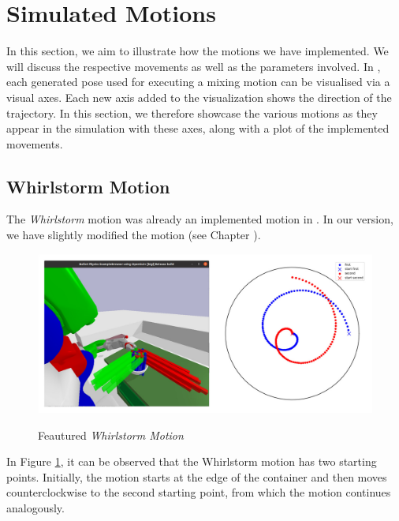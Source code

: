 \section{Simulated Motions}
\label{sec:simulated motions}
In this section, we aim to illustrate how the motions we have implemented.
We will discuss the respective movements as well as the parameters involved. In , each generated pose used for executing 
a mixing motion can be visualised via a visual axes. Each new axis added to the visualization shows the direction of the trajectory. 
In this section, we therefore showcase the various motions as they appear in the simulation with these axes, along with a plot of the implemented movements.



\subsection{Whirlstorm Motion}
The \textit{Whirlstorm} motion was already an implemented motion in . In our version, we have slightly modified the motion (see Chapter ).

\begin{figure}[H]
    \includegraphics[scale=0.3]{Graphics/whirlstorm_showcase.jpg}
    \label{fig:whirlstormshowcase}
    \caption{Feautured \textit{Whirlstorm Motion}}
\end{figure}

In Figure \ref{fig:whirlstormshowcase}, it can be observed that the Whirlstorm motion has two starting points. Initially, the motion starts at the edge of the container and then moves counterclockwise to the second starting point, from which the motion continues analogously.

